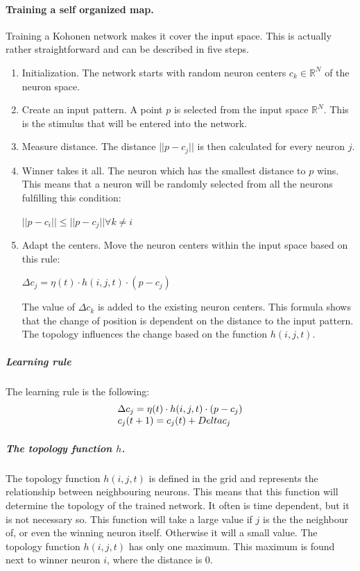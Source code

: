 \documentclass[pdftex,a4paper,12pt,twoside]{report}
\theoremstyle{plain} \newtheorem{theorem}{Theorem} \newtheorem{proposition}{Proposition} \newtheorem{lemma}{Lemma} \newtheorem*{corollary}{Corollary}
\theoremstyle{definition} \newtheorem{definition}{Definition} \newtheorem{conjecture}{Conjecture} \newtheorem*{example}{Example} \newtheorem{algorithm}{Algorithm}
\theoremstyle{remark} \newtheorem*{remark}{Remark} \newtheorem*{note}{Note} \newtheorem{case}{Case}
\begin{document}
\paragraph{Training a self organized map.}
Training a Kohonen network makes it cover the input space. This is actually rather straightforward and can be described in five steps.
\begin{enumerate}
\item Initialization. The network starts with random neuron centers $c_k \in \mathbb{R}^N$ of the neuron space.
\item Create an input pattern. A point $p$ is selected from the input space $\mathbb{R}^N$. This is the stimulus that will be entered into the network.
\item Measure distance. The distance $||p-c_j||$ is then calculated for every neuron $j$.
\item Winner takes it all. The neuron which has the smallest distance to $p$ wins. This means that a neuron will be randomly selected from all the neurons fulfilling this condition:
\begin{center}
$||p-c_i|| \leq ||p-c_j|| \forall k \neq i$
\end{center}
\item Adapt the centers. Move the neuron centers within the input space based on this rule:
\begin{center}
$\Delta c_j = \eta (t) \cdot h(i,j,t) \cdot (p-c_j)$
\end{center}
The value of $\Delta c_k$ is added to the existing neuron centers. This formula shows that the change of position is dependent on the distance to the input pattern. The topology influences the change based on the function $h(i,j,t)$.
\end{enumerate}
\subparagraph{Learning rule}
The learning rule is the following:
\begin{equation}
\begin{array}{l l}
\Delta c_j = \eta (t) \cdot h(i,j,t) \cdot (p-c_j) \\
c_j(t+1) = c_j(t) + Delta c_j
\end{array}
\end{equation}
\subparagraph{The topology function $h$.}
The topology function $h(i,j,t)$ is defined in the grid and represents the relationship between neighbouring neurons. This means that this function will determine the topology of the trained network. It often is time dependent, but it is not necessary so. This function will take a large value if $j$ is the the neighbour of, or even the winning neuron itself.  Otherwise it will a small value. The topology function $h(i,j,t)$ has only one maximum. This maximum is found next to winner neuron $i$, where the distance is 0.
\end{document}
